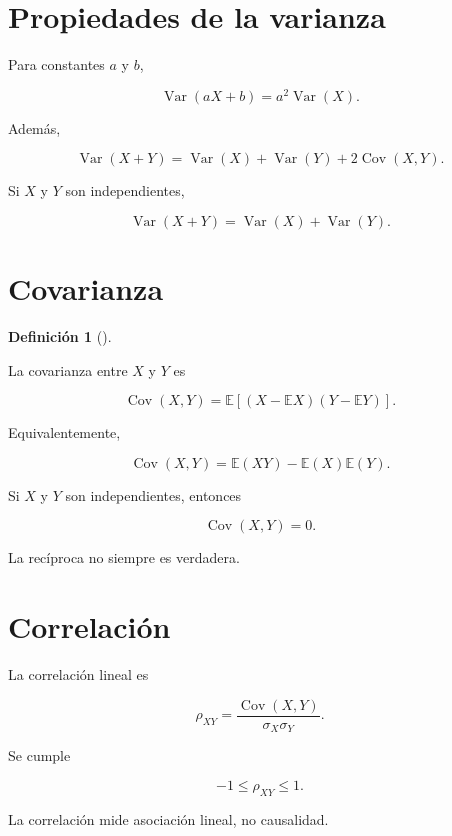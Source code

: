 \documentclass[
  spanish,
  11pt,
  letterpaper,
  DIV=11,
  numbers=noendperiod]{scrreprt}
\theoremstyle{definition}
\newtheorem{definition}{Definición}[chapter]
\theoremstyle{plain}
\theoremstyle{definition}
\theoremstyle{remark}
\begin{document}
\section{Propiedades de la varianza}\label{propiedades-de-la-varianza}

Para constantes \(a\) y \(b\),

\[
\operatorname{Var}(aX+b)
=
a^2\operatorname{Var}(X).
\]

Además,

\[
\operatorname{Var}(X+Y)
=
\operatorname{Var}(X)
+
\operatorname{Var}(Y)
+
2\operatorname{Cov}(X,Y).
\]

Si \(X\) y \(Y\) son independientes,

\[
\operatorname{Var}(X+Y)
=
\operatorname{Var}(X)
+
\operatorname{Var}(Y).
\]

\section{Covarianza}\label{covarianza}

\begin{definition}[]\protect\hypertarget{def-covarianza}{}\label{def-covarianza}

La covarianza entre \(X\) y \(Y\) es

\[
\operatorname{Cov}(X,Y)
=
\mathbb{E}
\left[
(X-\mathbb{E}X)
(Y-\mathbb{E}Y)
\right].
\]

\end{definition}

Equivalentemente,

\[
\operatorname{Cov}(X,Y)
=
\mathbb{E}(XY)
-
\mathbb{E}(X)\mathbb{E}(Y).
\]

Si \(X\) y \(Y\) son independientes, entonces

\[
\operatorname{Cov}(X,Y)=0.
\]

La recíproca no siempre es verdadera.

\section{Correlación}\label{correlaciuxf3n}

La correlación lineal es

\[
\rho_{XY}
=
\frac{
\operatorname{Cov}(X,Y)
}{
\sigma_X\sigma_Y
}.
\]

Se cumple

\[
-1\leq\rho_{XY}\leq 1.
\]

La correlación mide asociación lineal, no causalidad.
\end{document}
